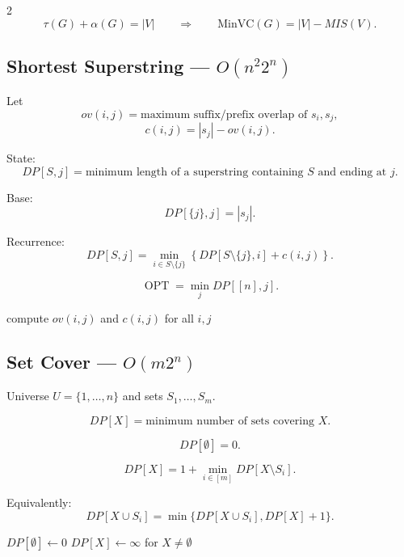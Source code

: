 \documentclass[8pt]{extarticle}
\theoremstyle{definition}
\newcommand{\OPT}{\operatorname{OPT}}
\begin{document}
\begin{multicols*}{2}
\[
\tau(G)+\alpha(G)=|V|
\qquad\Longrightarrow\qquad
\mathrm{MinVC}(G)=|V|-MIS(V).
\]


\subsection{Shortest Superstring --- $O(n^2 2^n)$}

Let
\[
ov(i,j)=
\text{maximum suffix/prefix overlap of }s_i,s_j,
\]
\[
c(i,j)=|s_j|-ov(i,j).
\]

State:
\[
DP[S,j]
=
\text{minimum length of a superstring containing }S
\text{ and ending at }j.
\]

Base:
\[
DP[\{j\},j]=|s_j|.
\]

Recurrence:
\[
DP[S,j]
=
\min_{i\in S\setminus\{j\}}
\left\{
DP[S\setminus\{j\},i]+c(i,j)
\right\}.
\]

\[
\OPT=\min_j DP[[n],j].
\]

\begin{algorithm}[H]
\DontPrintSemicolon
compute $ov(i,j)$ and $c(i,j)$ for all $i,j$\;
\;
\end{algorithm}


\subsection{Set Cover --- $O(m2^n)$}

Universe $U=\{1,\dots,n\}$ and sets
$S_1,\dots,S_m$.

\[
DP[X]
=
\text{minimum number of sets covering }X.
\]

\[
DP[\emptyset]=0.
\]

\[
DP[X]
=
1+
\min_{i\in[m]}
DP[X\setminus S_i].
\]

Equivalently:
\[
DP[X\cup S_i]
=
\min\{DP[X\cup S_i],DP[X]+1\}.
\]

\begin{algorithm}[H]
\DontPrintSemicolon
$DP[\emptyset]\gets0$\;
$DP[X]\gets\infty$ for $X\ne\emptyset$\;
\;
\end{algorithm}



\end{multicols*}
\end{document}
